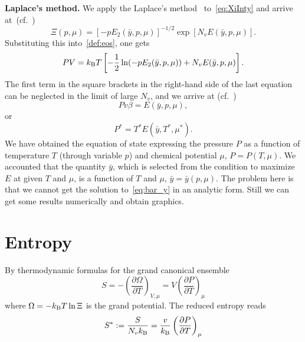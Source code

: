 \documentclass[12pt]{article}
\numberwithin{equation}{section}
\begin{document}
	\textbf{Laplace's method.} We apply the Laplace's method~\cite[(1.21)]{Fedoryuk89} to~\eqref{eq:XiInty} and arrive at~(cf.~\cite[(19)]{KD22})
	\begin{equation}
		\Xi(p,\mu) = [-p E_2(\bar{y},p,\mu)]^{-1/2} \exp[N_v E(\bar{y},p,\mu)].
	\end{equation}
	Substituting this into~\eqref{def:eos}, one gets
	\begin{equation}
		P V = k_{\rm B}T \left[-\frac{1}{2} \ln(-p E_2(\bar{y},p,\mu)) + N_v E(\bar{y},p,\mu)\right].
	\end{equation}
	The first term in the square brackets in the right-hand side of the last equation can be neglected in the limit of large $N_v$, and we arrive at (cf.~\cite[(2.27)]{KKD20})
	\begin{equation}
		P v \beta = E(\bar{y},p,\mu),
	\end{equation}
	or
	\begin{equation}
		P^* = T^* E(\bar{y},T^*,\mu^*).
	\end{equation}
	We have obtained the equation of state expressing the pressure $P$ as a function of temperature $T$ (through variable $p$) and chemical potential $\mu$, $P = P(T, \mu)$. We accounted that the quantity $\bar{y}$, which is selected from the condition to maximize $E$ at given $T$ and $\mu$, is a function of $T$ and $\mu$, $\bar{y} = \bar{y}(p,\mu)$. The problem here is that we cannot get the solution to~\eqref{eq:bar_y} in an analytic form. Still we can get some results numerically and obtain graphics.
	
	
	\section{Entropy}
	By thermodynamic formulas for the grand canonical ensemble
	\begin{equation}
		S = -\left(\frac{\partial \Omega}{\partial T}\right)_{V,\mu} = V\left(\frac{\partial P}{\partial T}\right)_{\mu}
	\end{equation}
	where $\Omega = -k_{\rm B}T \ln \Xi$ is the grand potential. The reduced entropy reads
	\begin{equation}
		S^* := \frac{S}{N_v k_{\rm B}} = \frac{v}{k_{\rm B}} \left(\frac{\partial P}{\partial T}\right)_{\mu}
	\end{equation}
	
	
\end{document}
